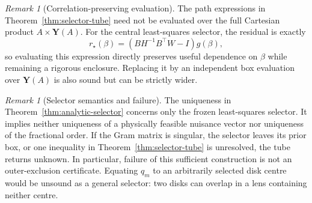 \documentclass[11pt]{article}
\theoremstyle{definition}
\theoremstyle{remark}
\newtheorem{remark}[theorem]{Remark}
\begin{document}
\begin{remark}[Correlation-preserving evaluation]
The path expressions in Theorem~\ref{thm:selector-tube} need not be evaluated
over the full Cartesian product \(A\times\boldsymbol Y(A)\).  For the central
least-squares selector, the residual is exactly
\[
 r_\star(\beta)=(BH^{-1}B^\top W-I)g(\beta),
\]
so evaluating this expression directly preserves useful dependence on
\(\beta\) while remaining a rigorous enclosure.  Replacing it by an
independent box evaluation over \(\boldsymbol Y(A)\) is also sound but can be
strictly wider.
\end{remark}

\begin{remark}[Selector semantics and failure]
The uniqueness in Theorem~\ref{thm:analytic-selector} concerns only the frozen
least-squares selector.  It implies neither uniqueness of a physically feasible
nuisance vector nor uniqueness of the fractional order.  If the Gram matrix is
singular, the selector leaves its prior box, or one inequality in
Theorem~\ref{thm:selector-tube} is unresolved, the tube returns unknown.  In
particular, failure of this sufficient construction is not an outer-exclusion
certificate.  Equating \(q_m\) to an arbitrarily selected disk centre would be
unsound as a general selector: two disks can overlap in a lens containing
neither centre.
\end{remark}
\end{document}
